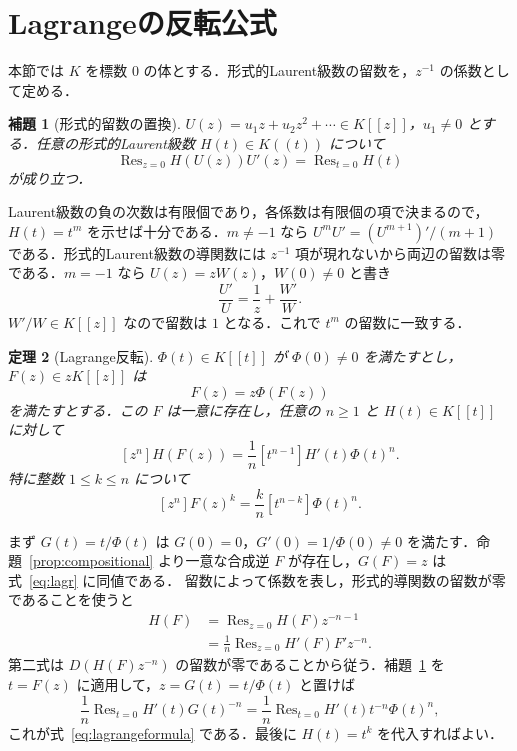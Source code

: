 \documentclass[a5paper,10pt,onecolumn]{jsarticle}
\makeatletter
\theoremstyle{mathnotetheorem}
\newtheorem{theorem}{定理}[section]
\newtheorem{lemma}[theorem]{補題}
\renewcommand{\proofname}{証明}
\renewenvironment{proof}[1][\proofname]{%
  \par\pushQED{\qed}\normalfont\topsep4\p@\@plus2\p@\relax
  \trivlist\item[\hskip\labelsep\bfseries #1]\ignorespaces
}{\popQED\endtrivlist\@endpefalse}
\makeatother
\begin{document}
\section{Lagrangeの反転公式}
本節では $K$ を標数 $0$ の体とする．形式的Laurent級数の留数を，$z^{-1}$ の係数として定める．
\begin{lemma}[形式的留数の置換]\label{lem:residue}
$U(z)=u_1z+u_2z^2+\cdots\in K[[z]]$，$u_1\ne0$ とする．任意の形式的Laurent級数 $H(t)\in K((t))$ について
\[
 \operatorname{Res}_{z=0}H(U(z))U'(z)
 =\operatorname{Res}_{t=0}H(t)
\]
が成り立つ．
\end{lemma}
\begin{proof}
Laurent級数の負の次数は有限個であり，各係数は有限個の項で決まるので，$H(t)=t^m$ を示せば十分である．$m\ne-1$ なら
$U^mU'=(U^{m+1})'/(m+1)$ である．形式的Laurent級数の導関数には $z^{-1}$ 項が現れないから両辺の留数は零である．$m=-1$ なら $U(z)=zW(z)$，$W(0)\ne0$ と書き
\[
 \frac{U'}U=\frac1z+\frac{W'}W.
\]
$W'/W\in K[[z]]$ なので留数は $1$ となる．これで $t^m$ の留数に一致する．
\end{proof}

\begin{theorem}[Lagrange反転]\label{thm:lagrange}
$\Phi(t)\in K[[t]]$ が $\Phi(0)\ne0$ を満たすとし，$F(z)\in zK[[z]]$ は
\[
 F(z)=z\Phi(F(z))
 \tag{2}\label{eq:lagr}
\]
を満たすとする．この $F$ は一意に存在し，任意の $n\ge1$ と $H(t)\in K[[t]]$ に対して
\[
 [z^n]H(F(z))=\frac1n[t^{n-1}]H'(t)\Phi(t)^n.
 \tag{3}\label{eq:lagrangeformula}
\]
特に整数 $1\le k\le n$ について
\[
 [z^n]F(z)^k=\frac{k}{n}[t^{n-k}]\Phi(t)^n.
\]
\end{theorem}
\begin{proof}
まず $G(t)=t/\Phi(t)$ は $G(0)=0$，$G'(0)=1/\Phi(0)\ne0$ を満たす．命題~\ref{prop:compositional} より一意な合成逆 $F$ が存在し，$G(F)=z$ は式~\eqref{eq:lagr} に同値である．
留数によって係数を表し，形式的導関数の留数が零であることを使うと
\begin{align*}
 [z^n]H(F)
 &=\operatorname{Res}_{z=0}H(F)z^{-n-1}\\
 &=\frac1n\operatorname{Res}_{z=0}H'(F)F'z^{-n}.
\end{align*}
第二式は $D(H(F)z^{-n})$ の留数が零であることから従う．補題~\ref{lem:residue} を $t=F(z)$ に適用して，$z=G(t)=t/\Phi(t)$ と置けば
\[
 \frac1n\operatorname{Res}_{t=0}H'(t)G(t)^{-n}
 =\frac1n\operatorname{Res}_{t=0}H'(t)t^{-n}\Phi(t)^n,
\]
これが式~\eqref{eq:lagrangeformula} である．最後に $H(t)=t^k$ を代入すればよい．
\end{proof}
\end{document}
